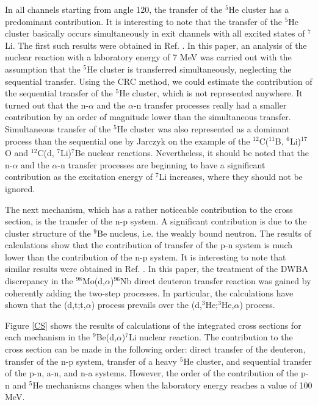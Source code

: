 \documentclass[10pt]{iopart}
\begin{document}
In all channels starting from angle 120, the transfer of the $^5$He cluster has a predominant contribution.
It is interesting to note that the transfer of the $^5$He cluster  basically occurs simultaneously in exit channels with all excited states of $^7$Li. The first such results were obtained in Ref. \cite{bodek1989} . In this paper, an analysis of the nuclear reaction with a laboratory energy of 7 MeV was carried out with the assumption that the $^5$He cluster  is transferred simultaneously, neglecting the sequential transfer. Using the CRC method, we could estimate the contribution of the sequential transfer of the $^5$He cluster, which is not represented anywhere. It turned out that the n-$\alpha$ and the $\alpha$-n transfer processes really had a smaller contribution by an order of magnitude lower than the simultaneous transfer. Simultaneous transfer of the $^5$He cluster was also represented as a dominant process than the sequential one by Jarczyk \etal \cite{jarczyk1996} on the example of the $^{12}$C($^{11}$B, $^6$Li)$^{17}$O and $^{12}$C(d, $^7$Li)$^{7}$Be nuclear reactions. Nevertheless, it should be noted that  the n-$\alpha$ and the $\alpha$-n transfer processes are beginning to have a significant contribution as the excitation energy of $^7$Li increases, where they should not be ignored.

The next mechanism, which has a rather noticeable contribution to the cross section, is the transfer of the n-p system. A significant contribution is due to the cluster structure of the $^9$Be nucleus, i.e. the weakly bound neutron. The results of calculations show that the contribution of transfer of  the p-n system is much lower than the contribution of the n-p system. It is interesting to note that similar results were obtained in Ref. \cite{coker1974}. In this paper, the treatment of the DWBA discrepancy in the $^{98}$Mo(d,$\alpha$)$^{96}$Nb direct deuteron transfer reaction was gained by coherently adding the two-step processes. In particular, the calculations have shown that the (d,t;t,$\alpha$) process prevails over the (d,$^3$He;$^3$He,$\alpha$) process.

 Figure \ref{CS} shows the results of calculations of the integrated cross sections for each mechanism in the $^9$Be(d,$\alpha$)$^7$Li nuclear reaction. The contribution to the cross section can be made in the following order: direct transfer of the deuteron, transfer of the n-p system, transfer of a heavy $^5$He cluster,  and sequential  transfer of the p-n, a-n, and n-a systems. However, the order of the contribution of the p-n and $^5$He mechanisms changes when the laboratory energy reaches a value of 100 MeV.
 
\end{document}
